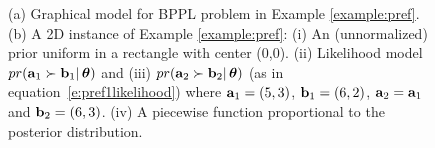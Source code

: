 \begin{figure}
\caption{\footnotesize 
(a) Graphical model for BPPL problem in Example \ref{example:pref}.
(b) A 2D instance of Example \ref{example:pref}: 
(i) An (unnormalized) prior uniform in a rectangle with center (0,0).
(ii) Likelihood model $pr(\textbf{a}_1 \succ \textbf{b}_1 | \, \boldsymbol\theta)$ and
(iii) $pr(\textbf{a}_2 \succ \textbf{b}_2 | \, \boldsymbol\theta)$ 
(as in equation~\ref{e:pref1likelihood}) where
$\textbf{a}_1 = (5, 3)$, $\textbf{b}_1 = (6, 2)$, $\textbf{a}_2 = \textbf{a}_1$ and $\textbf{b}_2 = (6, 3)$.
(iv) A piecewise function proportional to the posterior distribution.}
\label{fig:pref-up-down}
\end{figure}
